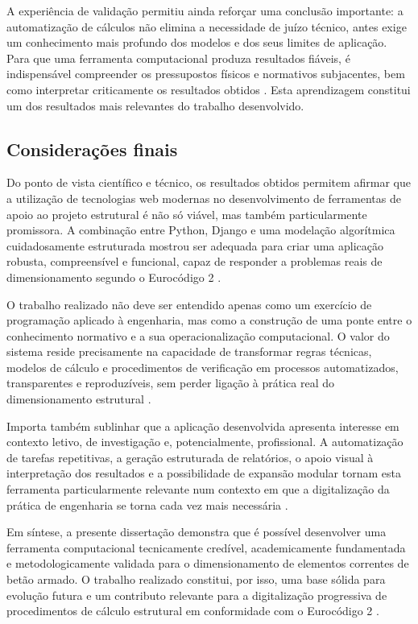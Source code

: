 A experiência de validação permitiu ainda reforçar uma conclusão importante: a automatização de cálculos não elimina a necessidade de juízo técnico, antes exige um conhecimento mais profundo dos modelos e dos seus limites de aplicação. Para que uma ferramenta computacional produza resultados fiáveis, é indispensável compreender os pressupostos físicos e normativos subjacentes, bem como interpretar criticamente os resultados obtidos \cite{EN1992,Goodchild,Mosley}. Esta aprendizagem constitui um dos resultados mais relevantes do trabalho desenvolvido.

\subsection{Considerações finais}

Do ponto de vista científico e técnico, os resultados obtidos permitem afirmar que a utilização de tecnologias web modernas no desenvolvimento de ferramentas de apoio ao projeto estrutural é não só viável, mas também particularmente promissora. A combinação entre Python, Django e uma modelação algorítmica cuidadosamente estruturada mostrou ser adequada para criar uma aplicação robusta, compreensível e funcional, capaz de responder a problemas reais de dimensionamento segundo o Eurocódigo 2 \cite{PythonDocs,DjangoDocs,EN1992}.

O trabalho realizado não deve ser entendido apenas como um exercício de programação aplicado à engenharia, mas como a construção de uma ponte entre o conhecimento normativo e a sua operacionalização computacional. O valor do sistema reside precisamente na capacidade de transformar regras técnicas, modelos de cálculo e procedimentos de verificação em processos automatizados, transparentes e reproduzíveis, sem perder ligação à prática real do dimensionamento estrutural \cite{EN1992,Appleton,PythonDocs}.

Importa também sublinhar que a aplicação desenvolvida apresenta interesse em contexto letivo, de investigação e, potencialmente, profissional. A automatização de tarefas repetitivas, a geração estruturada de relatórios, o apoio visual à interpretação dos resultados e a possibilidade de expansão modular tornam esta ferramenta particularmente relevante num contexto em que a digitalização da prática de engenharia se torna cada vez mais necessária \cite{DjangoDocs,DaileySVG,TikZManual}.

Em síntese, a presente dissertação demonstra que é possível desenvolver uma ferramenta computacional tecnicamente credível, academicamente fundamentada e metodologicamente validada para o dimensionamento de elementos correntes de betão armado. O trabalho realizado constitui, por isso, uma base sólida para evolução futura e um contributo relevante para a digitalização progressiva de procedimentos de cálculo estrutural em conformidade com o Eurocódigo 2 \cite{EN1992,CachimBases,Goodchild,Mosley}.

